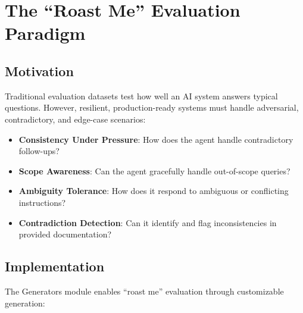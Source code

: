 \documentclass[11pt,a4paper]{article}
\begin{document}
\section{The ``Roast Me'' Evaluation Paradigm}

\subsection{Motivation}

Traditional evaluation datasets test how well an AI system answers typical questions. However, resilient, production-ready systems must handle adversarial, contradictory, and edge-case scenarios:

\begin{itemize}
    \item \textbf{Consistency Under Pressure}: How does the agent handle contradictory follow-ups?
    \item \textbf{Scope Awareness}: Can the agent gracefully handle out-of-scope queries?
    \item \textbf{Ambiguity Tolerance}: How does it respond to ambiguous or conflicting instructions?
    \item \textbf{Contradiction Detection}: Can it identify and flag inconsistencies in provided documentation?
\end{itemize}

\subsection{Implementation}

The Generators module enables ``roast me'' evaluation through customizable generation:
\end{document}
